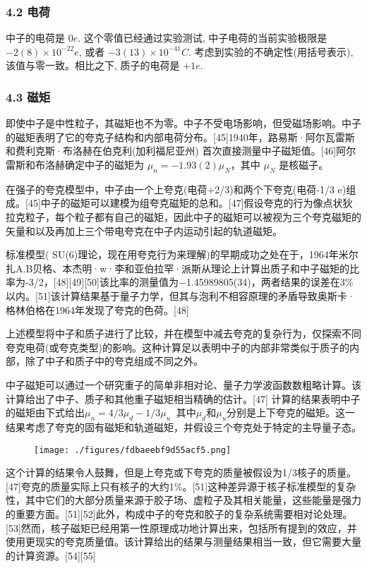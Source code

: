 \subsubsection{4.2 电荷}
中子的电荷是 $0  e$. 这个零值已经通过实验测试, 中子电荷的当前实验极限是 $-2(8) \times 10^{-22}  e$, 或者 $-3(13) \times 10^{-41}  C$. 考虑到实验的不确定性(用括号表示), 该值与零一致。相比之下, 质子的电荷是 $+1  e$.

\subsubsection{4.3 磁矩}
即使中子是中性粒子，其磁矩也不为零。中子不受电场影响，但受磁场影响。中子的磁矩表明了它的夸克子结构和内部电荷分布。[45]1940年，路易斯·阿尔瓦雷斯和费利克斯·布洛赫在伯克利(加利福尼亚州) 首次直接测量中子磁矩值。[46]阿尔雷斯和布洛赫确定中子的磁矩为 $\mu_n = -1.93(2) \mu_N$，其中 $\mu_N$ 是核磁子。

在强子的夸克模型中，中子由一个上夸克(电荷+2/3)和两个下夸克(电荷-1/3 e)组成。[45]中子的磁矩可以建模为组夸克磁矩的总和。[47]假设夸克的行为像点状狄拉克粒子，每个粒子都有自己的磁矩，因此中子的磁矩可以被视为三个夸克磁矩的矢量和以及再加上三个带电夸克在中子内运动引起的轨道磁矩。

标准模型( SU(6)理论，现在用夸克行为来理解)的早期成功之处在于，1964年米尔扎A.B贝格、本杰明·w·李和亚伯拉罕·派斯从理论上计算出质子和中子磁矩的比率为-3/2，[48][49][50]该比率的测量值为−1.45989805(34)，两者结果的误差在3\%以内。[51]该计算结果基于量子力学，但其与泡利不相容原理的矛盾导致奥斯卡·格林伯格在1964年发现了夸克的色荷。[48]

上述模型将中子和质子进行了比较，并在模型中减去夸克的复杂行为，仅探索不同夸克电荷(或夸克类型)的影响。这种计算足以表明中子的内部非常类似于质子的内部，除了中子和质子中的夸克组成不同之外。

中子磁矩可以通过一个研究重子的简单非相对论、量子力学波函数数粗略计算。该计算给出了中子、质子和其他重子磁矩相当精确的估计。[47] 计算的结果表明中子的磁矩由下式给出$\mu_n = 4/3 \mu_d - 1/3 \mu_u~$
其中$\mu_d$和$\mu_u$分别是上下夸克的磁矩。这一结果考虑了夸克的固有磁矩和轨道磁矩，并假设三个夸克处于特定的主导量子态。
\begin{figure}[ht]
\centering
\texttt{[image: ./figures/fdbaeebf9d55acf5.png]}
\caption \label{fig_Neutro_5}
\end{figure}
这个计算的结果令人鼓舞，但是上夸克或下夸克的质量被假设为1/3核子的质量。[47]夸克的质量实际上只有核子的大约1\%。[51]这种差异源于核子标准模型的复杂性，其中它们的大部分质量来源于胶子场、虚粒子及其相关能量，这些能量是强力的重要方面。[51][52]此外，构成中子的夸克和胶子的复杂系统需要相对论处理。[53]然而，核子磁矩已经用第一性原理成功地计算出来，包括所有提到的效应，并使用更现实的夸克质量值。该计算给出的结果与测量结果相当一致，但它需要大量的计算资源。[54][55]

